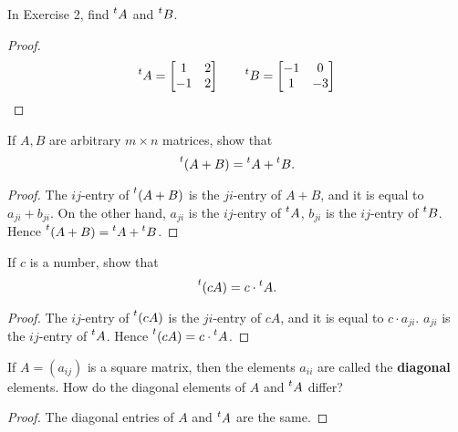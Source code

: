 \begin{exercise}
    In Exercise 2, find $\prescript{t}{}{A}$ and $\prescript{t}{}{B}$.
\end{exercise}

\begin{proof}
    \[
        \prescript{t}{}{A} = \begin{bmatrix}
            1  & 2 \\
            -1 & 2
        \end{bmatrix}
        \qquad
        \prescript{t}{}{B} = \begin{bmatrix}
            -1 & 0  \\
            1  & -3
        \end{bmatrix}
    \]
\end{proof}

\begin{exercise}
    If $A, B$ are arbitrary $m\times n$ matrices, show that
    \[
        \prescript{t}{}{(A + B)} = \prescript{t}{}{A} + \prescript{t}{}{B}.
    \]
\end{exercise}

\begin{proof}
    The $ij$-entry of $\prescript{t}{}{(A + B)}$ is the $ji$-entry of $A + B$, and it is equal to $a_{ji} + b_{ji}$. On the other hand, $a_{ji}$ is the $ij$-entry of $\prescript{t}{}{A}$, $b_{ji}$ is the $ij$-entry of $\prescript{t}{}{B}$. Hence $\prescript{t}{}{(A + B)} = \prescript{t}{}{A} + \prescript{t}{}{B}$.
\end{proof}

\begin{exercise}
    If $c$ is a number, show that
    \[
        \prescript{t}{}{(cA)} = c\cdot\prescript{t}{}{A}.
    \]
\end{exercise}

\begin{proof}
    The $ij$-entry of $\prescript{t}{}{(cA)}$ is the $ji$-entry of $cA$, and it is equal to $c\cdot a_{ji}$. $a_{ji}$ is the $ij$-entry of $\prescript{t}{}{A}$. Hence $\prescript{t}{}{(cA)} = c\cdot\prescript{t}{}{A}$.
\end{proof}

\begin{exercise}
    If $A = (a_{ij})$ is a square matrix, then the elements $a_{ii}$ are called the \textbf{diagonal} elements. How do the diagonal elements of $A$ and $\prescript{t}{}{A}$ differ?
\end{exercise}

\begin{proof}
    The diagonal entries of $A$ and $\prescript{t}{}{A}$ are the same.
\end{proof}

